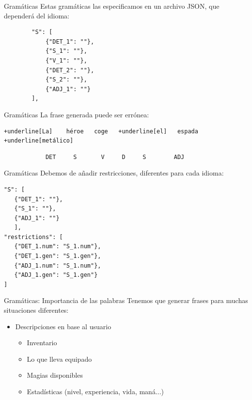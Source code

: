 \begin{frame}[t, fragile]{Gramáticas}
Estas gramáticas las especificamos en un archivo JSON, que dependerá del idioma:
	\begin{verbatim}
		"S": [
	    	{"DET_1": ""},
	    	{"S_1": ""},
	    	{"V_1": ""},
	    	{"DET_2": ""},
	    	{"S_2": ""},
	    	{"ADJ_1": ""}
		],
	\end{verbatim}
\end{frame}

\begin{frame}[t, fragile]{Gramáticas}
La frase generada puede ser errónea:
	\vspace*{\fill}
		\begin{Verbatim}[commandchars=+\[\]]
+underline[La]    héroe   coge   +underline[el]   espada   +underline[metálico]
		\end{Verbatim}
		\begin{verbatim}
			DET     S       V     D     S        ADJ
		\end{verbatim}
	\vspace*{\fill}
\end{frame}

\begin{frame}[t, fragile]{Gramáticas}
	Debemos de añadir restricciones, diferentes para cada idioma:
	\begin{verbatim}
"S": [
   {"DET_1": ""},
   {"S_1": ""},
   {"ADJ_1": ""}
   ],
"restrictions": [
   {"DET_1.num": "S_1.num"},
   {"DET_1.gen": "S_1.gen"},
   {"ADJ_1.num": "S_1.num"},
   {"ADJ_1.gen": "S_1.gen"}
]
	\end{verbatim}
\end{frame}


\begin{frame}[t, fragile]{Gramáticas: Importancia de las palabras}
	Tenemos que generar frases para muchas situaciones diferentes:
	\begin{itemize}
		\item<+-| alert@+> Descripciones en base al usuario
			\begin{itemize}
				\item Inventario
				\item Lo que lleva equipado
				\item Magias disponibles
				\item Estadísticas (nivel, experiencia, vida, maná...)
			\end{itemize}
	\end{itemize}
\end{frame}

